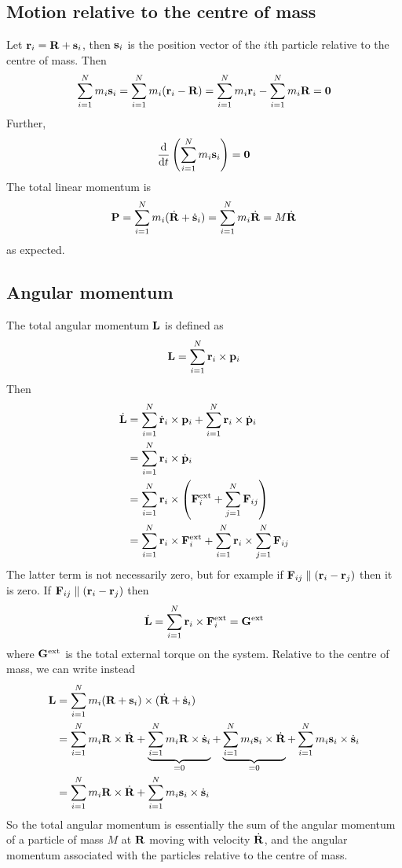 \subsection{Motion relative to the centre of mass}
Let \(\vb r_i = \vb R + \vb s_i\), then \(\vb s_i\) is the position vector of the \(i\)th particle relative to the centre of mass.
Then
\[
	\sum_{i=1}^N m_i \vb s_i = \sum_{i=1}^N m_i (\vb r_i - \vb R) = \sum_{i=1}^N m_i \vb r_i - \sum_{i=1}^N m_i \vb R = \vb 0
\]
Further,
\[
	\dv{t} \left( \sum_{i=1}^N m_i \vb s_i \right) = \vb 0
\]
The total linear momentum is
\[
	\vb P = \sum_{i=1}^N m_i (\dot{\vb R} + \dot{\vb s}_i) = \sum_{i=1}^N m_i \dot{\vb R} = M\dot{\vb R}
\]
as expected.

\subsection{Angular momentum}
The total angular momentum \(\vb L\) is defined as
\[
	\vb L = \sum_{i=1}^N \vb r_i \times \vb p_i
\]
Then
\begin{align*}
	\dot{\vb L} & = \sum_{i=1}^N \dot{\vb r}_i \times \vb p_i + \sum_{i=1}^N \vb r_i \times \dot{\vb p}_i                \\
	            & = \sum_{i=1}^N \vb r_i \times \dot{\vb p}_i                                                            \\
	            & = \sum_{i=1}^N \vb r_i \times \left( \vb F_i^\text{ext} + \sum_{j=1}^N \vb F_{ij} \right)              \\
	            & = \sum_{i=1}^N \vb r_i \times \vb F_i^\text{ext} + \sum_{i=1}^N \vb r_i \times \sum_{j=1}^N \vb F_{ij} \\
\end{align*}
The latter term is not necessarily zero, but for example if \(\vb F_{ij} \parallel (\vb r_i - \vb r_j)\) then it is zero.
If \(\vb F_{ij} \parallel (\vb r_i - \vb r_j)\) then
\[
	\dot{\vb L} = \sum_{i=1}^N \vb r_i \times \vb F_i^\text{ext} = \vb G^\text{ext}
\]
where \(\vb G^\text{ext}\) is the total external torque on the system.
Relative to the centre of mass, we can write instead
\begin{align*}
	\vb L & = \sum_{i=1}^N m_i (\vb R + \vb s_i) \times (\dot{\vb R} + \dot{\vb s}_i)                                                                                                                                                   \\
	      & = \sum_{i=1}^N m_i \vb R \times \dot{\vb R} + \underbrace{\sum_{i=1}^N m_i \vb R \times \dot{\vb s}_i}_{=0} + \underbrace{\sum_{i=1}^N m_i \vb s_i \times \dot{\vb R}}_{=0} + \sum_{i=1}^N m_i \vb s_i \times \dot{\vb s}_i \\
	      & = \sum_{i=1}^N m_i \vb R \times \dot{\vb R} + \sum_{i=1}^N m_i \vb s_i \times \dot{\vb s}_i
\end{align*}
So the total angular momentum is essentially the sum of the angular momentum of a particle of mass \(M\) at \(\vb R\) moving with velocity \(\dot{\vb R}\), and the angular momentum associated with the particles relative to the centre of mass.

